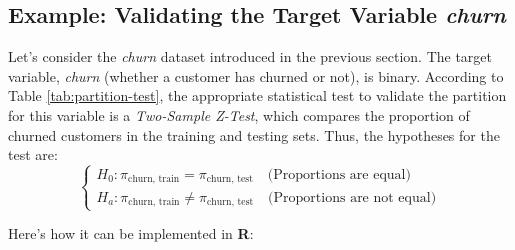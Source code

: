 \documentclass[
  11pt,
]{book}
\makeatletter
\newenvironment{Shaded}{}{}
\newcommand{\AttributeTok}[1]{#1}
\newcommand{\ControlFlowTok}[1]{\textcolor[rgb]{0.07,0.07,0.07}{#1}}
\newcommand{\DecValTok}[1]{#1}
\newcommand{\FloatTok}[1]{#1}
\newcommand{\FunctionTok}[1]{#1}
\newcommand{\NormalTok}[1]{#1}
\newcommand{\OtherTok}[1]{\textcolor[rgb]{0.39,0.39,0.39}{#1}}
\newcommand{\SpecialCharTok}[1]{\textcolor[rgb]{0.39,0.39,0.39}{#1}}
\newcommand{\StringTok}[1]{\textcolor[rgb]{0.39,0.39,0.39}{#1}}
\newenvironment{kframe}{%
\medskip{}
\setlength{\fboxsep}{.8em}
 \def\at@end@of@kframe{}%
 \ifinner\ifhmode%
  \def\at@end@of@kframe{\end{minipage}}%
  \begin{minipage}{\columnwidth}%
 \fi\fi%
 \def\FrameCommand##1{\hskip\@totalleftmargin \hskip-\fboxsep
 \colorbox{shadecolor}{##1}\hskip-\fboxsep
     \hskip-\linewidth \hskip-\@totalleftmargin \hskip\columnwidth}%
 \MakeFramed {\advance\hsize-\width
   \@totalleftmargin\z@ \linewidth\hsize
   \@setminipage}}%
 {\par\unskip\endMakeFramed%
 \at@end@of@kframe}
\renewenvironment{Shaded}{\begin{kframe}}{\end{kframe}}
\theoremstyle{definition}
\theoremstyle{definition}
\theoremstyle{definition}
\theoremstyle{definition}
\theoremstyle{remark}
\makeatother
\begin{document}
\subsection*{\texorpdfstring{Example: Validating the Target Variable \emph{churn}}{Example: Validating the Target Variable churn}}\label{example-validating-the-target-variable-churn}


Let's consider the \emph{churn} dataset introduced in the previous section. The target variable, \emph{churn} (whether a customer has churned or not), is binary. According to Table \ref{tab:partition-test}, the appropriate statistical test to validate the partition for this variable is a \emph{Two-Sample Z-Test}, which compares the proportion of churned customers in the training and testing sets. Thus, the hypotheses for the test are:\\
\[
\begin{cases}
H_0:  \pi_{\text{churn, train}} = \pi_{\text{churn, test}} \quad \text{(Proportions are equal)} \\
H_a:  \pi_{\text{churn, train}} \neq \pi_{\text{churn, test}} \quad \text{(Proportions are not equal)}
\end{cases}
\]

Here's how it can be implemented in \textbf{R}:

\begin{Shaded}
\end{Shaded}
\end{document}

